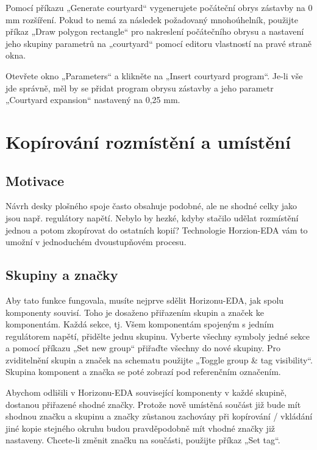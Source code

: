 \documentclass[letterpaper,10pt,czech]{sphinxmanual}
\begin{document}
Pomocí příkazu „Generate courtyard“ vygenerujete počáteční obrys zástavby na
0 mm rozšíření. Pokud to nemá za následek požadovaný mnohoúhelník, použijte
příkaz „Draw polygon rectangle“ pro nakreslení počátečního obrysu a nastavení
jeho skupiny parametrů na „courtyard“ pomocí editoru vlastností na
pravé straně okna.

Otevřete okno „Parameters“ a klikněte na „Insert courtyard program“. Je-li
vše jde správně, měl by se přidat program obrysu zástavby a jeho
parametr „Courtyard expansion“ nastavený na 0,25 mm.


\chapter{Kopírování rozmístění a umístění}
\label{\detokenize{copy-layout-placement_cz:kopirovani-rozmisteni-a-umisteni}}\label{\detokenize{copy-layout-placement_cz::doc}}

\section{Motivace}
\label{\detokenize{copy-layout-placement_cz:motivace}}
Návrh desky plošného spoje často obsahuje podobné, ale ne shodné celky jako jsou např. regulátory napětí. Nebylo by hezké, kdyby stačilo udělat rozmístění jednou a potom zkopírovat do ostatních kopií? Technologie Horzion-EDA vám to umožní v jednoduchém dvoustupňovém procesu.


\section{Skupiny a značky}
\label{\detokenize{copy-layout-placement_cz:skupiny-a-znacky}}
Aby tato funkce fungovala, musíte nejprve sdělit Horizonu-EDA, jak spolu komponenty souvisí. Toho je dosaženo přiřazením skupin a značek ke komponentám. Každá sekce, tj. Všem komponentám spojeným s
jedním regulátorem napětí, přidělte jednu skupinu. Vyberte všechny symboly jedné sekce a pomocí příkazu „Set new group“ přiřaďte všechny do nové skupiny. Pro zviditelnění skupin a značek na schematu použijte „Toggle group \& tag visibility“. Skupina komponent a značka se poté zobrazí pod referenčním označením.

Abychom odlišili v Horizonu-EDA související komponenty v každé skupině, dostanou přiřazené shodné značky. Protože nově umístěná součást již bude mít shodnou značku a skupinu a značky zůstanou zachovány při kopírování / vkládání jiné kopie stejného okruhu budou pravděpodobně mít vhodné značky již nastaveny. Chcete-li změnit značku na součásti, použijte příkaz „Set tag“.
\end{document}
